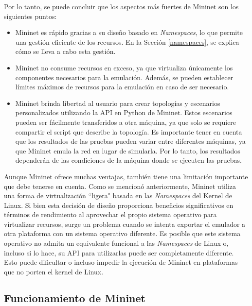 Por lo tanto, se puede concluir que los aspectos más fuertes de Mininet son los siguientes puntos:

\begin{itemize}
    \item Mininet es rápido gracias a su diseño basado en \textit{Namespaces}, lo que permite una gestión eficiente de los recursos. En la Sección \ref{namespaces}, se explica cómo se lleva a cabo esta gestión.
    \item Mininet no consume recursos en exceso, ya que virtualiza únicamente los componentes necesarios para la emulación. Además, se pueden establecer límites máximos de recursos para la emulación en caso de ser necesario.
    \item Mininet brinda libertad al usuario para crear topologías y escenarios personalizados utilizando la API en Python de Mininet. Estos escenarios pueden ser fácilmente transferidos a otra máquina, ya que solo se requiere compartir el script que describe la topología. Es importante tener en cuenta que los resultados de las pruebas pueden variar entre diferentes máquinas, ya que Mininet emula la red en lugar de simularla. Por lo tanto, los resultados dependerán de las condiciones de la máquina donde se ejecuten las pruebas.
\end{itemize}

Aunque Mininet ofrece muchas ventajas, también tiene una limitación importante que debe tenerse en cuenta. Como se mencionó anteriormente, Mininet utiliza una forma de virtualización ``ligera" basada en las \textit{Namespaces} del Kernel de Linux. Si bien esta decisión de diseño proporciona beneficios significativos en términos de rendimiento al aprovechar el propio sistema operativo para virtualizar recursos, surge un problema cuando se intenta exportar el emulador a otra plataforma con un sistema operativo diferente. Es posible que este sistema operativo no admita un equivalente funcional a las \textit{Namespaces} de Linux o, incluso si lo hace, su API para utilizarlas puede ser completamente diferente. Esto puede dificultar o incluso impedir la ejecución de Mininet en plataformas que no porten el kernel de Linux.


\subsection{Funcionamiento de Mininet}

